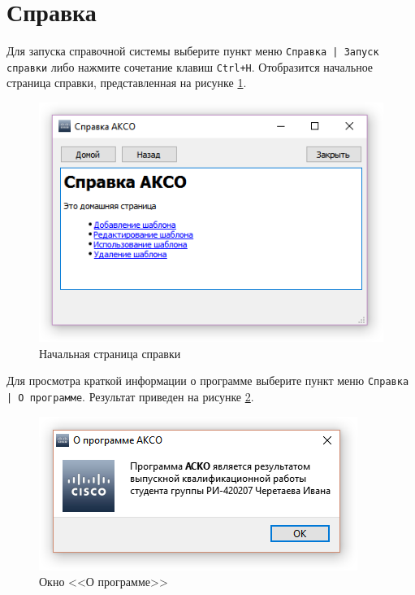 \section{Справка}

Для запуска справочной системы выберите пункт меню \texttt{Справка | Запуск справки} либо нажмите сочетание клавиш \texttt{Ctrl+H}. Отобразится начальное страница справки, представленная на рисунке \ref{fig:help}.

\begin{figure}[th!]
\centering
\includegraphics[width=0.8\linewidth]{pic/help}
\caption{Начальная страница справки}
\label{fig:help}
\end{figure}


Для просмотра краткой информации о программе выберите пункт меню \texttt{Справка | О программе}. Результат приведен на рисунке \ref{fig:about}.
\begin{figure}[th!]
\centering
\includegraphics[width=0.8\linewidth]{pic/about}
\caption{Окно <<О программе>>}
\label{fig:about}
\end{figure}
